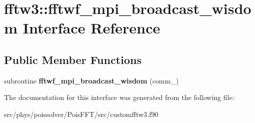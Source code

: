 \hypertarget{interfacefftw3_1_1fftwf__mpi__broadcast__wisdom}{}\section{fftw3\+:\+:fftwf\+\_\+mpi\+\_\+broadcast\+\_\+wisdom Interface Reference}
\label{interfacefftw3_1_1fftwf__mpi__broadcast__wisdom}
\subsection*{Public Member Functions}
\begin{DoxyCompactItemize}
\item 
subroutine {\bfseries fftwf\+\_\+mpi\+\_\+broadcast\+\_\+wisdom} (comm\+\_\+)\hypertarget{interfacefftw3_1_1fftwf__mpi__broadcast__wisdom_a1e5dea8eb30fe38e74b05ecaf831bd4a}{}\label{interfacefftw3_1_1fftwf__mpi__broadcast__wisdom_a1e5dea8eb30fe38e74b05ecaf831bd4a}

\end{DoxyCompactItemize}


The documentation for this interface was generated from the following file\+:\begin{DoxyCompactItemize}
\item 
src/phys/poissolver/\+Pois\+F\+F\+T/src/customfftw3.\+f90\end{DoxyCompactItemize}
